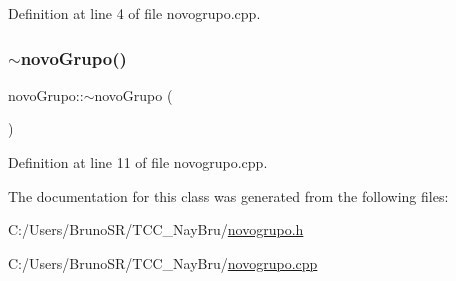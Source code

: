 Definition at line 4 of file novogrupo.\+cpp.

\hypertarget{classnovo_grupo_a561957c27e43bc56cc595a37db18aa33}{}\label{classnovo_grupo_a561957c27e43bc56cc595a37db18aa33} 
\subsubsection{\texorpdfstring{$\sim$novo\+Grupo()}{~novoGrupo()}}
{\footnotesize\ttfamily novo\+Grupo\+::$\sim$novo\+Grupo (\begin{DoxyParamCaption}{ }\end{DoxyParamCaption})}



Definition at line 11 of file novogrupo.\+cpp.



The documentation for this class was generated from the following files\+:\begin{DoxyCompactItemize}
\item 
C\+:/\+Users/\+Bruno\+S\+R/\+T\+C\+C\+\_\+\+Nay\+Bru/\hyperlink{novogrupo_8h}{novogrupo.\+h}\item 
C\+:/\+Users/\+Bruno\+S\+R/\+T\+C\+C\+\_\+\+Nay\+Bru/\hyperlink{novogrupo_8cpp}{novogrupo.\+cpp}\end{DoxyCompactItemize}
